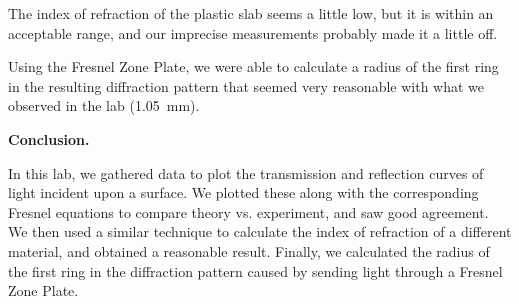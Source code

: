 \documentclass{article}
\newcommand{\labhead}[1]{
  \vspace{1em}
  {\bf #1}$_{\,}$
  \hline
  \vspace{1em}
}
\begin{document}
\begin{multicols*}{2}
The index of refraction of the plastic slab seems a little low, but it is within an acceptable range, and our imprecise
measurements probably made it a little off. 

Using the Fresnel Zone Plate, we were able to calculate a radius of the first ring in the resulting diffraction pattern
that seemed very reasonable with what we observed in the lab (\SI{1.05}{\milli\meter}). 

\labhead{Conclusion.}
In this lab, we gathered data to plot the transmission and reflection curves of light incident upon a surface. We
plotted these along with the corresponding Fresnel equations to compare theory vs. experiment, and saw good
agreement. We then used a similar technique to calculate the index of refraction of a different material, and obtained a
reasonable result. Finally, we calculated the radius of the first ring in the diffraction pattern caused by sending
light through a Fresnel Zone Plate. 
\end{multicols*}
\end{document}
